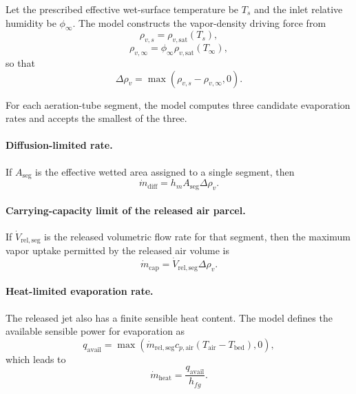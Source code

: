 \documentclass{article}
\begin{document}
Let the prescribed effective wet-surface temperature be $T_s$ and the inlet
relative humidity be $\phi_{\infty}$. The model constructs the vapor-density
driving force from
\begin{equation}
\rho_{v,s} = \rho_{v,\mathrm{sat}}(T_s),
\end{equation}
\begin{equation}
\rho_{v,\infty}
= \phi_{\infty} \rho_{v,\mathrm{sat}}(T_{\infty}),
\end{equation}
so that
\begin{equation}
\Delta \rho_v
= \max\!\left(\rho_{v,s} - \rho_{v,\infty}, 0\right).
\end{equation}

For each aeration-tube segment, the model computes three candidate
evaporation rates and accepts the smallest of the three.

\paragraph*{Diffusion-limited rate.}
If $A_{\mathrm{seg}}$ is the effective wetted area assigned to a single
segment, then
\begin{equation}
\dot{m}_{\mathrm{diff}}
= h_m A_{\mathrm{seg}} \Delta \rho_v.
\end{equation}

\paragraph*{Carrying-capacity limit of the released air parcel.}
If $\dot{V}_{\mathrm{rel,seg}}$ is the released volumetric flow rate for that
segment, then the maximum vapor uptake permitted by the released air volume is
\begin{equation}
\dot{m}_{\mathrm{cap}}
= \dot{V}_{\mathrm{rel,seg}} \Delta \rho_v.
\end{equation}

\paragraph*{Heat-limited evaporation rate.}
The released jet also has a finite sensible heat content. The model defines
the available sensible power for evaporation as
\begin{equation}
q_{\mathrm{avail}}
= \max\!\left(
\dot{m}_{\mathrm{rel,seg}} c_{p,\mathrm{air}}
(T_{\mathrm{air}} - T_{\mathrm{bed}}), 0
\right),
\end{equation}
which leads to
\begin{equation}
\dot{m}_{\mathrm{heat}}
= \frac{q_{\mathrm{avail}}}{h_{fg}}.
\end{equation}
\end{document}
